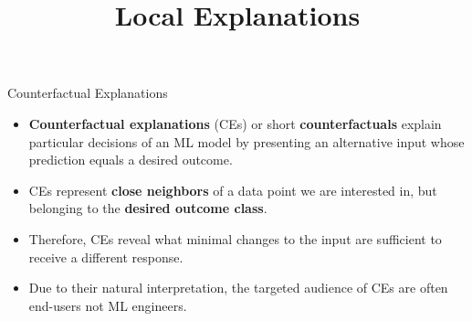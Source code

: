 \documentclass[11pt,compress,t,notes=noshow, xcolor=table]{beamer}
\title{Local Explanations}
\institute{\href{https://compstat-lmu.github.io/lecture_i2ml/}{compstat-lmu.github.io/lecture\_i2ml}}
\date{}
\begin{document}
	










\begin{vbframe}{Counterfactual Explanations}
	\begin{itemize}
	    \item \textbf{Counterfactual explanations} (CEs) or short \textbf{counterfactuals} explain particular decisions of an ML model by presenting an alternative input whose prediction equals a desired outcome.
		\item CEs represent \textbf{close neighbors} of a data point we are interested in, but belonging to the \textbf{desired outcome class}. 
		\item Therefore, CEs reveal what minimal changes to the input are sufficient to receive a different response.
		\item Due to their natural interpretation, the targeted audience of CEs are often end-users not ML engineers.
	\end{itemize}
\end{vbframe}
\end{document}
